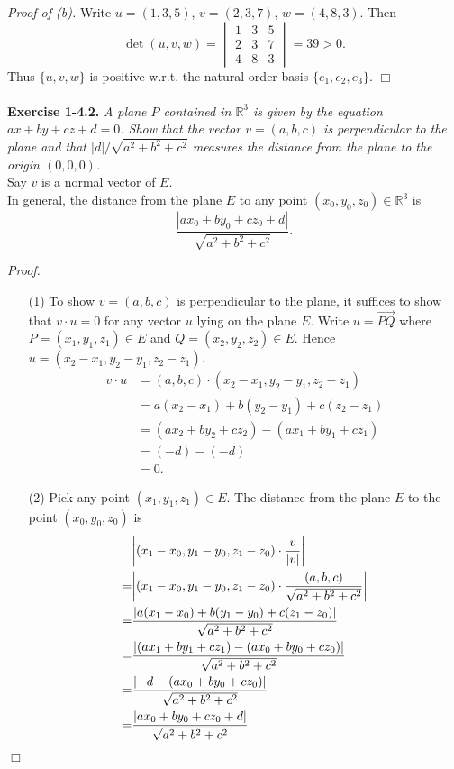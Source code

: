 \documentclass{article}
\begin{document}
\emph{Proof of (b).}
Write $u = (1,3,5)$, $v = (2,3,7)$, $w = (4,8,3)$.
Then
$$\det(u,v,w)
= \begin{vmatrix}
  1 & 3 & 5 \\
  2 & 3 & 7 \\
  4 & 8 & 3
  \end{vmatrix}
= 39 > 0.$$
Thus $\{u,v,w\}$ is positive w.r.t. the natural order basis $\{ e_1, e_2, e_3 \}$.
$\Box$ \\\\






\textbf{Exercise 1-4.2.}
\emph{A plane $P$ contained in $\mathbb{R}^3$ is given by the equation
$ax+by+cz+d=0$.
Show that the vector $v=(a,b,c)$ is perpendicular to the plane and that
$|d|/\sqrt{a^2+b^2+c^2}$ measures the distance from the plane to the origin $(0,0,0)$.} \\

Say $v$ is a normal vector of $E$. \\

In general, the distance from the plane $E$ to
any point $(x_0, y_0, z_0) \in \mathbb{R}^3$ is
$$\frac{|ax_0+by_0+cz_0+d|}{\sqrt{a^2+b^2+c^2}}.$$

\emph{Proof.}
\begin{enumerate}
\item[(1)]
To show $v=(a,b,c)$ is perpendicular to the plane,
it suffices to show that $v \cdot u = 0$ for any vector $u$ lying on the plane $E$.
Write $u = \overrightarrow{PQ}$ where
$P = (x_1, y_1, z_1) \in E$ and $Q = (x_2, y_2, z_2) \in E$.
Hence $u = (x_2-x_1, y_2-y_1, z_2-z_1)$.
\begin{align*}
v \cdot u
&=
(a,b,c) \cdot (x_2-x_1, y_2-y_1, z_2-z_1) \\
&= a(x_2-x_1) + b(y_2-y_1) + c(z_2-z_1) \\
&= (ax_2 + by_2 + cz_2) - (ax_1 + by_1 + cz_1) \\
&= (-d) - (-d) \\
&= 0.
\end{align*}
\item[(2)]
Pick any point $(x_1,y_1,z_1) \in E$.
The distance from the plane $E$ to the point $(x_0, y_0, z_0)$ is
\begin{align*}
&\abs{(x_1-x_0,y_1-y_0,z_1-z_0) \cdot \frac{v}{|v|}} \\
=& \abs{(x_1-x_0,y_1-y_0,z_1-z_0) \cdot \frac{(a,b,c)}{\sqrt{a^2+b^2+c^2}}} \\
=& \frac{\abs{a(x_1-x_0)+b(y_1-y_0)+c(z_1-z_0)}}{\sqrt{a^2+b^2+c^2}} \\
=& \frac{\abs{(ax_1+by_1+cz_1) - (ax_0+by_0+cz_0)}}{\sqrt{a^2+b^2+c^2}} \\
=& \frac{\abs{-d - (ax_0+by_0+cz_0)}}{\sqrt{a^2+b^2+c^2}} \\
=& \frac{\abs{ax_0+by_0+cz_0+d}}{\sqrt{a^2+b^2+c^2}}.
\end{align*}
\end{enumerate}
$\Box$ \\\\
\end{document}
